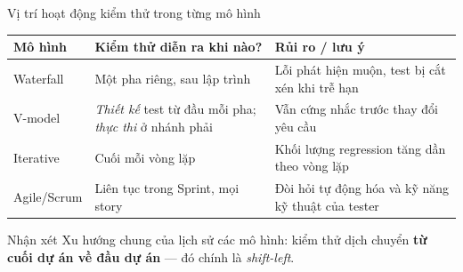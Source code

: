 \documentclass[aspectratio=169,12pt]{beamer}
\begin{document}
\begin{frame}{Vị trí hoạt động kiểm thử trong từng mô hình}
  \begingroup\centering
  \small
  \setlength{\tabcolsep}{4pt}
  \begin{tabular}{p{2.2cm}p{4.6cm}p{4.9cm}}
    \toprule
    \textbf{Mô hình} & \textbf{Kiểm thử diễn ra khi nào?} & \textbf{Rủi ro / lưu ý} \\
    \midrule
    Waterfall & Một pha riêng, sau lập trình & Lỗi phát hiện muộn, test bị cắt xén khi trễ hạn \\
    \midrule
    V-model & \textit{Thiết kế} test từ đầu mỗi pha; \textit{thực thi} ở nhánh phải & Vẫn cứng nhắc trước thay đổi yêu cầu \\
    \midrule
    Iterative & Cuối mỗi vòng lặp & Khối lượng regression tăng dần theo vòng lặp \\
    \midrule
    Agile/Scrum & Liên tục trong Sprint, mọi story & Đòi hỏi tự động hóa và kỹ năng kỹ thuật của tester \\
    \bottomrule
  \end{tabular}\par\endgroup

  \begin{block}{Nhận xét}
    Xu hướng chung của lịch sử các mô hình: kiểm thử dịch chuyển
    \textbf{từ cuối dự án về đầu dự án} --- đó chính là \textit{shift-left}.
  \end{block}
\end{frame}
\end{document}
